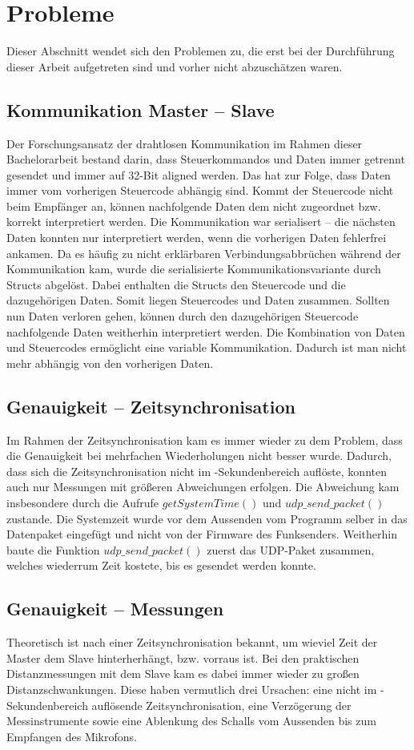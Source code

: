 \newpage
\section{Probleme}
Dieser Abschnitt wendet sich den Problemen zu, die erst bei der Durchführung dieser Arbeit aufgetreten sind und vorher nicht abzuschätzen waren.

\subsection{Kommunikation Master -- Slave}
Der Forschungsansatz der drahtlosen Kommunikation im Rahmen dieser Bachelorarbeit bestand darin, dass Steuerkommandos und Daten immer getrennt gesendet und immer auf 32-Bit aligned werden. Das hat zur Folge, dass Daten immer vom vorherigen Steuercode abhängig sind. Kommt der Steuercode nicht beim Empfänger an, können nachfolgende Daten dem nicht zugeordnet bzw. korrekt interpretiert werden. Die Kommunikation war serialisert -- die nächsten Daten konnten nur interpretiert werden, wenn die vorherigen Daten fehlerfrei ankamen. Da es häufig zu nicht erklärbaren Verbindungsabbrüchen während der Kommunikation kam, wurde die serialisierte Kommunikationsvariante durch Structs abgelöst. Dabei enthalten die Structs den Steuercode und die dazugehörigen Daten. Somit liegen Steuercodes und Daten zusammen. Sollten nun Daten verloren gehen, können durch den dazugehörigen Steuercode nachfolgende Daten weitherhin interpretiert werden. Die Kombination von Daten und Steuercodes ermöglicht eine variable Kommunikation. Dadurch ist man nicht mehr abhängig von den vorherigen Daten.

\subsection{Genauigkeit -- Zeitsynchronisation}
Im Rahmen der Zeitsynchronisation kam es immer wieder zu dem Problem, dass die Genauigkeit bei mehrfachen Wiederholungen nicht besser wurde. Dadurch, dass sich die Zeitsynchronisation nicht im \si{\mu}-Sekundenbereich auflöste, konnten auch nur Messungen mit größeren Abweichungen erfolgen. Die Abweichung kam insbesondere durch die Aufrufe $getSystemTime()$ und $udp\_send\_packet()$ zustande. Die Systemzeit wurde vor dem Aussenden vom Programm selber in das Datenpaket eingefügt und nicht von der Firmware des Funksenders. Weitherhin baute die Funktion $udp\_send\_packet()$ zuerst das UDP-Paket zusammen, welches wiederrum Zeit kostete, bis es gesendet werden konnte.

\subsection{Genauigkeit -- Messungen}
Theoretisch ist nach einer Zeitsynchronisation bekannt, um wieviel Zeit der Master dem Slave hinterherhängt, bzw. vorraus ist. Bei den praktischen Distanzmessungen mit dem Slave kam es dabei immer wieder zu großen Distanzschwankungen. Diese haben vermutlich drei Ursachen: eine nicht im \si{\mu}-Sekundenbereich auflösende Zeitsynchronisation, eine Verzögerung der Messinstrumente sowie eine Ablenkung des Schalls vom Aussenden bis zum Empfangen des Mikrofons.
